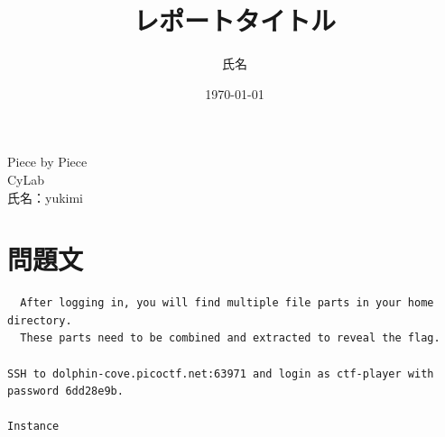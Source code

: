\documentclass[a4paper,11pt,lualatex,ja=standard]{bxjsarticle}
\newcommand{\cover}[3]{
  \thispagestyle{empty}
  \vspace*{4cm}
  \begin{center}
    {\LARGE #1}\\[2cm]
    {\Large #2}\\[3cm]
    {\large 氏名：#3}\\[1cm]
  \end{center}
  \newpage
}
\begin{document}
\cover{Piece by Piece}{CyLab}{yukimi}

\title{レポートタイトル}
\author{氏名}
\date{\today}
\section{問題文}
\begin{verbatim}
  After logging in, you will find multiple file parts in your home directory. 
  These parts need to be combined and extracted to reveal the flag.

SSH to dolphin-cove.picoctf.net:63971 and login as ctf-player with password 6dd28e9b.

Instance

\end{verbatim}
\end{document}
